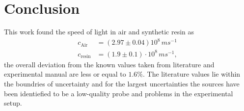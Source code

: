 \section{Conclusion}
\label{sec:conclusion}
This work found the speed of light in air and synthetic resin as
\begin{align}
  c_\text{Air} &= (2.97 \pm 0.04) 10^8 \, \si{ms^{-1}} \\
  c_\text{resin} &= (1.9 \pm 0.1) \cdot 10^8 \, \si{ms^{-1}},
\end{align}
the overall deviation from the known values taken from literature and experimental manual are less
or equal to $1.6\%$. The literature values lie within the boundries of uncertainty and for the
largest uncertainties the sources have been identiefied to be a low-quality probe and problems in
the experimental setup.

